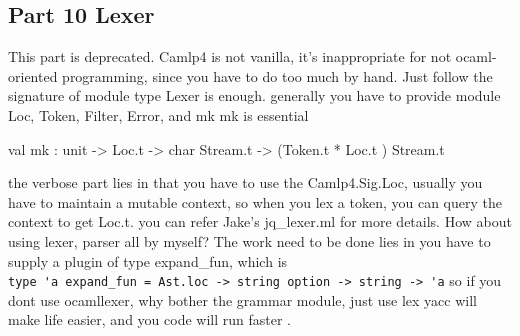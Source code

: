 \subsection{ Part 10 Lexer }

  This part is deprecated. Camlp4 is not vanilla, it's inappropriate
  for not ocaml-oriented programming, since you have to do too much by
  hand.  Just follow the signature of module type Lexer is enough.
  generally you have to provide module Loc, Token, Filter, Error, and
  mk mk is essential

  \begin{ocamlcode}
val mk : unit -> Loc.t -> char Stream.t -> (Token.t * Loc.t ) Stream.t     
  \end{ocamlcode}

  the verbose part lies in that you have to use the Camlp4.Sig.Loc,
  usually you have to maintain a mutable context, so when you lex a
  token, you can query the context to get Loc.t. you can refer Jake's jq\_lexer.ml
  for more details. How about using lexer, parser all by myself?
  The work need to be done lies in you have to supply a plugin of type
  expand\_fun, which is \\
  \verb|type 'a expand_fun = Ast.loc -> string option -> string -> 'a|
  so if you dont use ocamllexer, why bother the grammar module, just
  use lex yacc will make life easier, and you code will run faster . 

